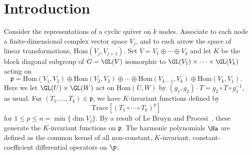 \section{Introduction}

Consider the representations of a cyclic quiver on $k$ nodes. Associate to each node a finite-dimensional complex vector space $V_j$, and to each arrow the space of linear transformations, $\mbox{Hom}(V_j, V_{j+1})$.  Set $V = V_1 \oplus \cdots \oplus V_k$ and let $K$ be the block diagonal subgroup of $G=\GL(V)$ isomorphic to $\GL(V_1) \times \cdots \times \GL(V_k)$ acting on
\begin{equation*}
    \mathfrak p = \mbox{Hom}(V_1,V_2) \oplus \mbox{Hom}(V_2,V_3) \oplus \cdots \oplus \mbox{Hom}(V_{k-1}, V_k) \oplus \mbox{Hom}(V_k, V_1).
\end{equation*}
Here we let $\GL(U) \times \GL(W)$ act on $\mbox{Hom}(U,W)$ by $(g_1,g_2) \cdot T  = g_2 \circ T \circ g_1^{-1}$, as usual. For $(T_1, \dots, T_k) \in \mathfrak p$, we have $K$-invariant functions defined by
\begin{equation*}
    \text{Trace}\left[ (T_1 \circ \cdots \circ T_k)^p \right]
\end{equation*}
for $1 \leq p \leq n = \min \{\dim V_j \}$. By a result of Le Bruyn and Procesi~\cite{LeBryunProcesi1990}, these generate the $K$-invariant functions on $\mathfrak p$. The harmonic polynomials $\Ha$ are defined as the common kernel of all non-constant, $K$-invariant, constant-coefficient differential operators on $\p$. 

